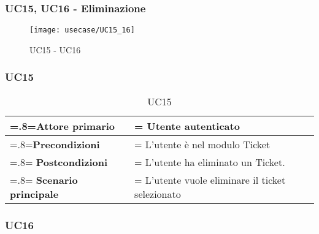 \subsubsection{UC15, UC16 - Eliminazione}
       
\begin{figure}[H]
    \centering 
    \texttt{[image: usecase/UC15\_16]}
    \caption{UC15 - UC16}
\end{figure}
 
\subsubsection{UC15}
 
       \begin{table}[H]
                \centering
                \renewcommand{\arraystretch}{1.8}
                \renewcommand\tabularxcolumn[1]{m{#1}}
                \begin{tabularx}{0.9\textwidth} {
                    >{\hsize=.8\hsize\linewidth=\hsize}X
                    >{\hsize=1.2\hsize\linewidth=\hsize}X}
                    \hline
                    \textbf{Attore primario} & Utente autenticato \\
                    \hline
                    \textbf{Precondizioni} & L'utente è nel modulo Ticket\\
                    \hline
                    \textbf{Postcondizioni} & L'utente ha eliminato un Ticket.\\
                    \hline
                    \textbf{Scenario principale} & L'utente vuole eliminare il ticket selezionato \\
                    \hline
                    
                \end{tabularx}
                \caption{UC15}
            \end{table}          

\subsubsection{UC16}
 
